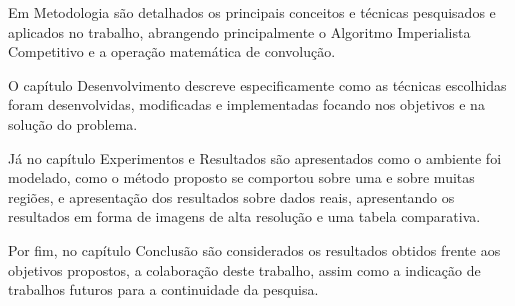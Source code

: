 Em Metodologia são detalhados os principais conceitos e técnicas pesquisados e aplicados no trabalho, abrangendo principalmente o Algoritmo Imperialista Competitivo e a operação matemática de convolução.

O capítulo Desenvolvimento descreve especificamente como as técnicas escolhidas foram desenvolvidas, modificadas e implementadas focando nos objetivos e na solução do problema.

Já no capítulo Experimentos e Resultados são apresentados como o ambiente foi modelado, como o método proposto se comportou sobre uma e sobre muitas regiões, e apresentação dos resultados sobre dados reais, apresentando os resultados em forma de imagens de alta resolução e uma tabela comparativa.

Por fim, no capítulo Conclusão são considerados os resultados obtidos frente aos objetivos propostos, a colaboração deste trabalho, assim como a indicação de trabalhos futuros para a continuidade da pesquisa.




